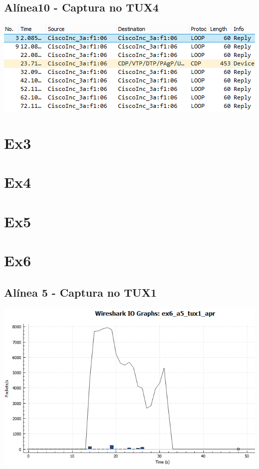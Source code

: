 \documentclass[11pt,a4paper,reqno]{report}
\numberwithin{equation}{section}
\begin{document}
\begin{appendices}
\subsection{Alínea10 - Captura no TUX4}
\includegraphics[width=18cm]{ex2_a10_tux4.png}

\section{Ex3}

\section{Ex4}

\section{Ex5}

\section{Ex6}

\subsection{Alínea 5 - Captura no TUX1}
\label{ex6_a5_1io}
\includegraphics[width=18cm]{ex6_a5_tux1_IO.png}

\end{appendices}
\end{document}
